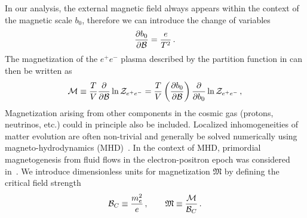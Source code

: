 In our analysis, the external magnetic field always appears within the context of the magnetic scale $b_{0}$, therefore we can introduce the change of variables
\begin{gather}
 \frac{\partial b_{0}}{\partial{\cal B}}=\frac{e}{T^{2}}\,.
\end{gather}
The magnetization of the $e^{+}e^{-}$ plasma described by the partition function in  can then be written as
\begin{gather}
 \label{defmagetization}
 {\cal M}\equiv\frac{T}{V}\frac{\partial}{\partial{\cal B}}\ln{{\cal Z}_{e^{+}e^{-}}} = \frac{T}{V}\left(\frac{\partial b_{0}}{\partial{\cal B}}\right)\frac{\partial}{\partial b_{0}}\ln{{\cal Z}_{e^{+}e^{-}}}\,,
\end{gather}
Magnetization arising from other components in the cosmic gas (protons, neutrinos, etc.) could in principle also be included. Localized inhomogeneities of matter evolution are often non-trivial and generally be solved numerically using magneto-hydrodynamics (MHD)~\cite{melrose2008quantum,Vazza:2017qge,Vachaspati:2020blt}. In the context of MHD, primordial magnetogenesis from fluid flows in the electron-positron epoch was considered in~\cite{Gopal:2004ut,Perrone:2021srr}. We introduce dimensionless units for magnetization ${\mathfrak M}$ by defining the critical field strength
\begin{gather}
 {\cal B}_{C}\equiv\frac{m_{e}^{2}}{e}\,,\qquad{\mathfrak M}\equiv\frac{\cal M}{{\cal B}_{C}}\,.
\end{gather}

